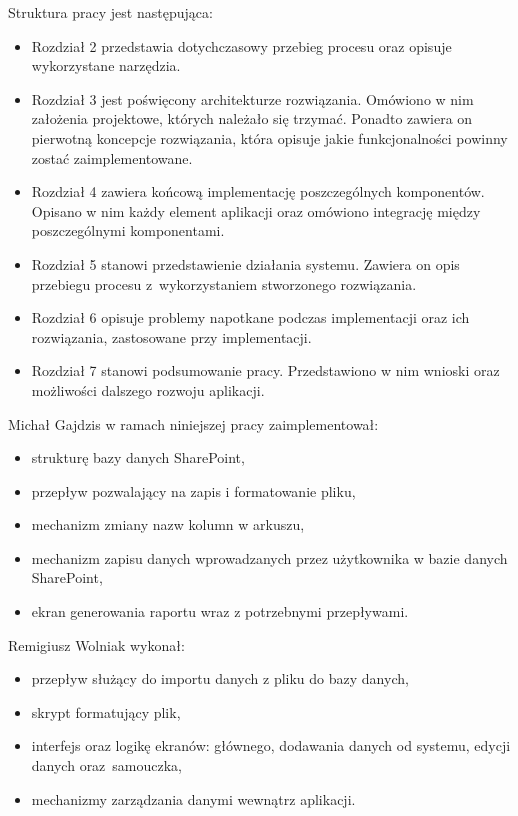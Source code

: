 \pagebreak
Struktura pracy jest następująca:
\begin{itemize}
    \item Rozdział 2  przedstawia dotychczasowy przebieg procesu oraz opisuje wykorzystane narzędzia.

    \item Rozdział 3 jest poświęcony architekturze rozwiązania. Omówiono w nim założenia projektowe, których należało się trzymać. Ponadto zawiera on pierwotną koncepcje rozwiązania, która opisuje jakie funkcjonalności powinny zostać zaimplementowane.

    \item Rozdział 4 zawiera końcową implementację poszczególnych komponentów. Opisano w nim każdy element aplikacji oraz omówiono integrację między poszczególnymi komponentami.

    \item Rozdział 5 stanowi przedstawienie działania systemu. Zawiera on opis przebiegu procesu z~wykorzystaniem stworzonego rozwiązania.

    \item Rozdział 6 opisuje problemy napotkane podczas implementacji oraz ich rozwiązania, zastosowane przy implementacji.

    \item Rozdział 7 stanowi podsumowanie pracy. Przedstawiono w nim wnioski oraz możliwości dalszego rozwoju aplikacji.
\end{itemize}

\vspace{0.5cm}
\noindent Michał Gajdzis w ramach niniejszej pracy zaimplementował:
\begin{itemize}
    \item strukturę bazy danych SharePoint,
    \item przepływ pozwalający na zapis i formatowanie pliku,
    \item mechanizm zmiany nazw kolumn w arkuszu,
    \item mechanizm zapisu danych wprowadzanych przez użytkownika w bazie danych SharePoint,
    \item ekran generowania raportu wraz z potrzebnymi przepływami.
\end{itemize}

\vspace{0.5cm}
\noindent Remigiusz Wolniak wykonał:
\begin{itemize}
    \item przepływ służący do importu danych z pliku do bazy danych,
    \item skrypt formatujący plik,
    \item interfejs oraz logikę ekranów: głównego, dodawania danych od systemu, edycji danych oraz~samouczka,
    \item mechanizmy zarządzania danymi wewnątrz aplikacji.
\end{itemize}
